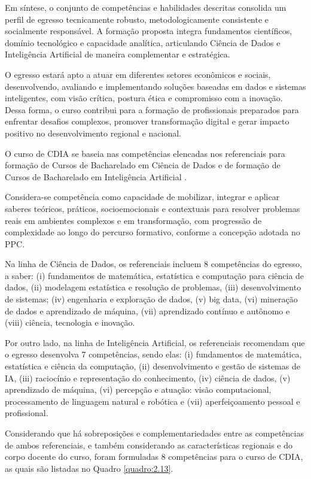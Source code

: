 Em síntese, o conjunto de competências e habilidades descritas consolida um perfil de egresso tecnicamente robusto, metodologicamente consistente e socialmente responsável. A formação proposta integra fundamentos científicos, domínio tecnológico e capacidade analítica, articulando Ciência de Dados e Inteligência Artificial de maneira complementar e estratégica.

O egresso estará apto a atuar em diferentes setores econômicos e sociais, desenvolvendo, avaliando e implementando soluções baseadas em dados e sistemas inteligentes, com visão crítica, postura ética e compromisso com a inovação. Dessa forma, o curso contribui para a formação de profissionais preparados para enfrentar desafios complexos, promover transformação digital e gerar impacto positivo no desenvolvimento regional e nacional.

O curso de CDIA se baseia nas competências elencadas nos referenciais para formação de Cursos de Bacharelado em Ciência de Dados \cite{SBC_REF_CD_2023} e de formação de Cursos de Bacharelado em Inteligência Artificial \cite{SBC_REF_IA_2024}.

Considera-se competência como capacidade de mobilizar, integrar e aplicar saberes teóricos, práticos, socioemocionais e contextuais para resolver problemas reais em ambientes complexos e em transformação, com progressão de complexidade ao longo do percurso formativo, conforme a concepção adotada no PPC.

Na linha de Ciência de Dados, os referenciais incluem 8 competências do egresso, a saber: (i) fundamentos de matemática, estatística e computação para ciência de dados, (ii) modelagem estatística e resolução de problemas, (iii) desenvolvimento de sistemas; (iv) engenharia e exploração de dados, (v) big data, (vi) mineração de dados e aprendizado de máquina, (vii) aprendizado contínuo e autônomo e (viii) ciência, tecnologia e inovação.

Por outro lado, na linha de Inteligência Artificial, os referenciais recomendam que o egresso desenvolva 7 competências, sendo elas: (i) fundamentos de matemática, estatística e ciência da computação, (ii) desenvolvimento e gestão de sistemas de IA, (iii) raciocínio e representação do conhecimento, (iv) ciência de dados, (v) aprendizado de máquina, (vi) percepção e atuação: visão computacional, processamento de linguagem natural e robótica e (vii) aperfeiçoamento pessoal e profissional.

Considerando que há sobreposições e complementariedades entre as competências de ambos referenciais, e também considerando as características regionais e do corpo docente do curso, foram formuladas 8 competências para o curso de CDIA, as quais são listadas no Quadro \ref{quadro:2.13}.

